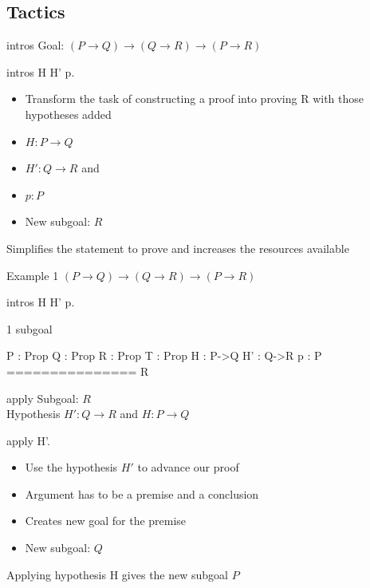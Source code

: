 \subsection{Tactics}
\begin{frame}[fragile]{intros}
	Goal: $(P \rightarrow Q) \rightarrow (Q \rightarrow R) \rightarrow (P \rightarrow R)$ \\
	\medskip
	\pause
	\begin{user}
	intros H H' p.
	\end{user}
	\pause
	\begin{itemize}
		\item Transform the task of constructing a proof into proving R with those hypotheses added
		\pause
		\item $H:P \rightarrow Q$
		\pause
		\item $H':Q \rightarrow R$ and
		\pause
		\item $p:P$
		\pause
		\item New subgoal: $R$
	\end{itemize}
	\pause
	Simplifies the statement to prove and increases the resources available
\end{frame}
\begin{frame}[fragile]{Example 1}
	$(P \rightarrow Q) \rightarrow (Q \rightarrow R) \rightarrow (P \rightarrow R)$
	\pause
	\begin{user}
		intros H H' p.
	\end{user}
	\pause
	\begin{coq}
		1 subgoal

		P : Prop
		Q : Prop
		R : Prop
		T : Prop
		H : P->Q
		H' : Q->R
		p : P
		===============
		 R
	\end{coq}
\end{frame}
\begin{frame}[fragile]{apply}
	Subgoal: $R$\\
	\medskip
	Hypothesis $H': Q \rightarrow R$ and $H:P \rightarrow Q$
	\medskip
	\pause
	\begin{user}
	apply H'.
	\end{user}
	\begin{itemize}
		\item Use the hypothesis $H'$ to advance our proof
		\pause
		\item Argument has to be a premise and a conclusion
		\pause
		\item Creates new goal for the premise
		\pause
		\item New subgoal: $Q$
	\end{itemize}
	\pause
	Applying hypothesis H gives the new subgoal $P$
\end{frame}

